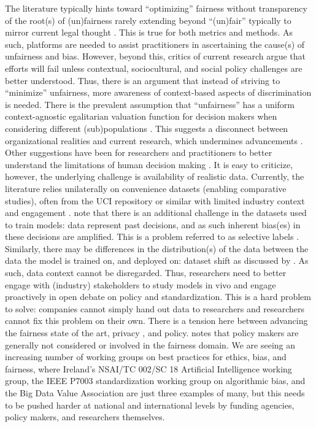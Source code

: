 \label{sec:context}
The literature typically hints toward ``optimizing'' fairness without transparency of the root(s) of (un)fairness  rarely extending beyond ``(un)fair''  typically to mirror current legal thought . This is true for both metrics and methods. As such, platforms are needed to assist practitioners in ascertaining the cause(s) of unfairness and bias. However, beyond this, critics of current research  argue that efforts will fail unless contextual, sociocultural, and social policy challenges are better understood. Thus, there is an argument that instead of striving  to ``minimize'' unfairness, more awareness of context-based aspects of discrimination is needed. There is the prevalent assumption that ``unfairness'' has a uniform context-agnostic egalitarian valuation function for decision makers when considering different (sub)populations . This suggests a disconnect between organizational realities and current research, which undermines advancements . Other suggestions have been for \ml researchers and practitioners to better understand the limitations of human decision making .  
It is easy to criticize, however, the underlying challenge is availability of realistic data. Currently, the literature relies unilaterally on convenience datasets (enabling comparative studies), often from the UCI repository  or similar with limited industry context and engagement  .  note that there is an additional challenge in the datasets used to train models: data represent past decisions, and as such inherent bias(es) in these decisions are amplified. This is a problem referred to as selective labels . Similarly, there may be differences in the distribution(s) of the data between the data the model is trained on, and deployed on: dataset shift as discussed by . As such, data context cannot be disregarded. 
Thus, researchers need to better engage with (industry) stakeholders to study models in vivo and engage proactively in open debate on policy and standardization. This is a hard problem to solve: companies cannot simply hand out data to researchers and researchers cannot fix this problem on their own. There is a tension here between advancing the fairness state of the art, privacy , and policy.  notes that policy makers are generally not considered or involved in the \ml fairness domain. We are seeing an increasing number of working groups on best practices for ethics, bias, and fairness, where Ireland's NSAI/TC 002/SC 18 Artificial Intelligence working group, the IEEE P7003 standardization working group on algorithmic bias, and the Big Data Value Association are just three examples of many, but this needs to be pushed harder at national and international levels by funding agencies, policy makers, and researchers themselves.

